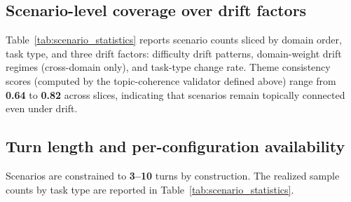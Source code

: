 \subsection{Scenario-level coverage over drift factors}
Table~\ref{tab:scenario_statistics} reports scenario counts sliced by domain order, task type, and three drift factors: difficulty drift patterns, domain-weight drift regimes (cross-domain only), and task-type change rate. Theme consistency scores (computed by the topic-coherence validator defined above) range from \textbf{0.64} to \textbf{0.82} across slices, indicating that scenarios remain topically connected even under drift.

\subsection{Turn length and per-configuration availability}
Scenarios are constrained to \textbf{3--10} turns by construction. The realized sample counts by task type are reported in Table~\ref{tab:scenario_statistics}.

